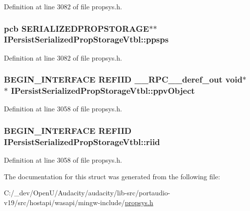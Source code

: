 Definition at line 3082 of file propsys.\+h.

\subsubsection[{\texorpdfstring{ppsps}{ppsps}}]{ {\bf pcb} {\bf S\+E\+R\+I\+A\+L\+I\+Z\+E\+D\+P\+R\+O\+P\+S\+T\+O\+R\+A\+GE}$\ast$$\ast$ I\+Persist\+Serialized\+Prop\+Storage\+Vtbl\+::ppsps}\hypertarget{struct_i_persist_serialized_prop_storage_vtbl_a05cbca3f5fed0fdfc60d544fa9425ee4}{}\label{struct_i_persist_serialized_prop_storage_vtbl_a05cbca3f5fed0fdfc60d544fa9425ee4}


Definition at line 3082 of file propsys.\+h.

\subsubsection[{\texorpdfstring{ppv\+Object}{ppvObject}}]{\setlength{\rightskip}{0pt plus 5cm}B\+E\+G\+I\+N\+\_\+\+I\+N\+T\+E\+R\+F\+A\+CE {\bf R\+E\+F\+I\+ID} {\bf \+\_\+\+\_\+\+R\+P\+C\+\_\+\+\_\+deref\+\_\+out} {\bf void}$\ast$$\ast$ I\+Persist\+Serialized\+Prop\+Storage\+Vtbl\+::ppv\+Object}\hypertarget{struct_i_persist_serialized_prop_storage_vtbl_a33619eb247144134901782eb7adcf2b3}{}\label{struct_i_persist_serialized_prop_storage_vtbl_a33619eb247144134901782eb7adcf2b3}


Definition at line 3058 of file propsys.\+h.

\subsubsection[{\texorpdfstring{riid}{riid}}]{\setlength{\rightskip}{0pt plus 5cm}B\+E\+G\+I\+N\+\_\+\+I\+N\+T\+E\+R\+F\+A\+CE {\bf R\+E\+F\+I\+ID} I\+Persist\+Serialized\+Prop\+Storage\+Vtbl\+::riid}\hypertarget{struct_i_persist_serialized_prop_storage_vtbl_aeede399dabe059f99222aec74b910ab1}{}\label{struct_i_persist_serialized_prop_storage_vtbl_aeede399dabe059f99222aec74b910ab1}


Definition at line 3058 of file propsys.\+h.



The documentation for this struct was generated from the following file\+:\begin{DoxyCompactItemize}
\item 
C\+:/\+\_\+dev/\+Open\+U/\+Audacity/audacity/lib-\/src/portaudio-\/v19/src/hostapi/wasapi/mingw-\/include/\hyperlink{propsys_8h}{propsys.\+h}\end{DoxyCompactItemize}
